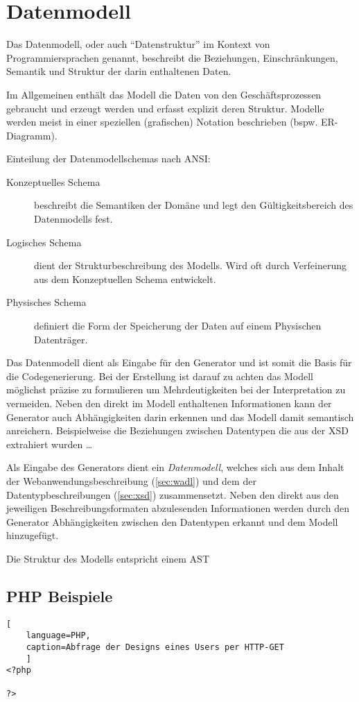 \chapter{Datenmodell}

\begin{thesisDefinition}[Datenmodell]
Das Datenmodell, oder auch \enquote{Datenstruktur} im Kontext von Programmiersprachen genannt, beschreibt die Beziehungen, Einschränkungen, Semantik und Struktur der darin enthaltenen Daten.
\end{thesisDefinition}

Im Allgemeinen enthält das Modell die Daten von den Geschäftsprozessen gebraucht und erzeugt werden und erfasst explizit deren Struktur. Modelle werden meist in einer speziellen (grafischen) Notation beschrieben (bspw. ER-Diagramm). 

Einteilung der Datenmodellschemas nach ANSI: %
\begin{description}
    \item[Konzeptuelles Schema]
        beschreibt die Semantiken der Domäne und legt den Gültigkeitsbereich des Datenmodells fest.
    \item[Logisches Schema]
        dient der Strukturbeschreibung des Modells. Wird oft durch Verfeinerung aus dem Konzeptuellen Schema entwickelt.
    \item[Physisches Schema]
        definiert die Form der Speicherung der Daten auf einem Physischen Datenträger.
\end{description}

Das Datenmodell dient als Eingabe für den Generator und ist somit die Basis für die Codegenerierung. Bei der Erstellung ist darauf zu achten das Modell möglichst präzise zu formulieren um Mehrdeutigkeiten bei der Interpretation zu vermeiden. 
Neben den direkt im Modell enthaltenen Informationen kann der Generator auch Abhängigkeiten darin erkennen und das Modell damit semantisch anreichern. Beispielweise die Beziehungen zwischen Datentypen die aus der \gls{XSD} extrahiert wurden \ldots

Als Eingabe des Generators dient ein \emph{Datenmodell}, welches sich aus dem Inhalt der Webanwendungsbeschreibung (\cref{sec:wadl}) und dem der Datentypbeschreibungen (\cref{sec:xsd}) zusammensetzt. 
Neben den direkt aus den jeweiligen Beschreibungsformaten abzulesenden Informationen werden durch den Generator Abhängigkeiten zwischen den Datentypen erkannt und dem Modell hinzugefügt. %

Die Struktur des Modells entspricht einem \gls{AST}


\section{PHP Beispiele}

\begin{lstlisting}[
    language=PHP,
    caption=Abfrage der Designs eines Users per HTTP-GET
    ]
<?php

?>
\end{lstlisting}

